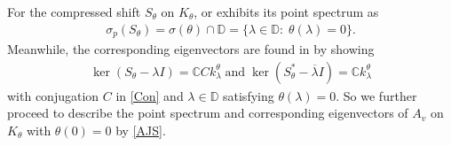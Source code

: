 \documentclass[12pt,reqno]{amsart}
\theoremstyle{definition}
\theoremstyle{remark}
\numberwithin{equation}{section}
\newcommand{\ol}{\overline}
\begin{document}
For the compressed shift $S_\theta$ on   $K_\theta$,   \cite[Lemma 2.5]{Sarason1} or \cite[Corollary 9.24]{GMR} exhibits its point spectrum   as \begin{align}\sigma_p(S_\theta)=\sigma(\theta)\cap\mathbb{D}=\{\lambda\in \mathbb{D}:\;\theta(\lambda)=0\}.\label{point}\end{align} Meanwhile, the corresponding eigenvectors are found in \cite[Corollary 9.25]{GMR} by showing \begin{align}\ker(S_\theta-\lambda I)=\mathbb{C}Ck_\lambda^\theta\;\mbox{and}\;\ker(S_\theta^*-\ol{\lambda}I)
=\mathbb{C}k_\lambda^\theta\label{eigek}\end{align}  with conjugation $C$ in \eqref{Con} and $\lambda\in \mathbb{D}$ satisfying $\theta(\lambda)=0.$ So we further proceed to describe the point spectrum and corresponding eigenvectors of $A_v$  on $K_\theta$ with $\theta(0)=0$ by \eqref{AJS}.
\end{document}
